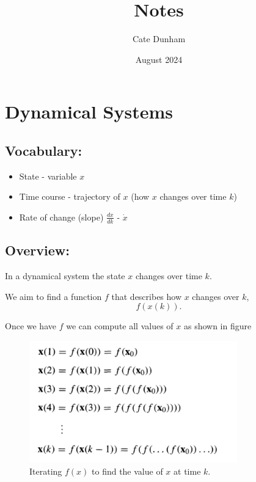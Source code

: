 \documentclass{article}
\title{Notes}
\author{Cate Dunham}
\date{August 2024}
\begin{document}
\maketitle

\section{Dynamical Systems}

\subsection{Vocabulary:}
\begin{itemize}
    \item State - variable $x$
    \item Time course - trajectory of $x$ (how $x$ changes over time $k$)
    \item Rate of change (slope) $\frac{dx}{dk}$ - $\dot{x}$
\end{itemize}

\subsection{Overview:}
In a dynamical system the state $x$ changes over time $k$.

We aim to find a function $f$ that describes how $x$ changes over $k$, 
\begin{equation}
    f(x(k)).
\end{equation}

Once we have $f$ we can compute all values of $x$ as shown in figure 
\begin{figure}[H]
    \centering
    \includegraphics[width=90mm]{images/dynamical_systems_iteration.png}
    \caption{Iterating $f(x)$ to find the value of $x$ at time $k$.}
    \label{fig:dynamical_systems_iteration}
\end{figure}


\end{document}
